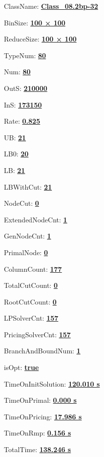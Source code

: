 \documentclass[11pt]{article}
\begin{document}
\pagestyle{empty}


ClassName: \underline{\textbf{Class_08.2bp-32}}
\par
BinSize: \underline{\textbf{100 × 100}}
\par
ReduceSize: \underline{\textbf{100 × 100}}
\par
TypeNum: \underline{\textbf{80}}
\par
Num: \underline{\textbf{80}}
\par
OutS: \underline{\textbf{210000}}
\par
InS: \underline{\textbf{173150}}
\par
Rate: \underline{\textbf{0.825}}
\par
UB: \underline{\textbf{21}}
\par
LB0: \underline{\textbf{20}}
\par
LB: \underline{\textbf{21}}
\par
LBWithCut: \underline{\textbf{21}}
\par
NodeCut: \underline{\textbf{0}}
\par
ExtendedNodeCnt: \underline{\textbf{1}}
\par
GenNodeCnt: \underline{\textbf{1}}
\par
PrimalNode: \underline{\textbf{0}}
\par
ColumnCount: \underline{\textbf{177}}
\par
TotalCutCount: \underline{\textbf{0}}
\par
RootCutCount: \underline{\textbf{0}}
\par
LPSolverCnt: \underline{\textbf{157}}
\par
PricingSolverCnt: \underline{\textbf{157}}
\par
BranchAndBoundNum: \underline{\textbf{1}}
\par
isOpt: \underline{\textbf{true}}
\par
TimeOnInitSolution: \underline{\textbf{120.010 s}}
\par
TimeOnPrimal: \underline{\textbf{0.000 s}}
\par
TimeOnPricing: \underline{\textbf{17.986 s}}
\par
TimeOnRmp: \underline{\textbf{0.156 s}}
\par
TotalTime: \underline{\textbf{138.246 s}}
\par
\newpage


\end{document}
